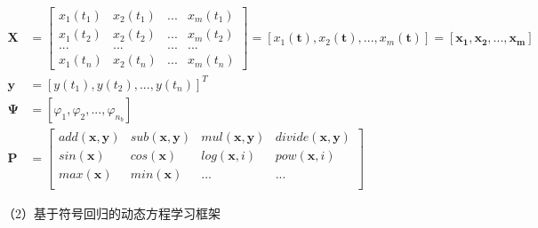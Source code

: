 \begin{subequations}
\begin{align}
\mathbf{X} &= \begin{bmatrix}
x_{1}(t_{1}) & x_{2}(t_{1}) & ... & x_{m}(t_{1}) \\ 
x_{1}(t_{2}) & x_{2}(t_{2})  & ...  & x_{m}(t_{2}) \\ 
... & ... & ...  & ... \\ 
x_{1}(t_{n}) & x_{2}(t_{n})  & ...  & x_{m}(t_{n}) 
\end{bmatrix} = [x_{1}(\mathbf{t}), x_{2}(\mathbf{t}), ..., x_{m}(\mathbf{t})] = [\mathbf{x_{1}}, \mathbf{x_{2}}, ..., \mathbf{x_{m}}] \label{equ:sr-object-func-x} \\
\mathbf{y} &= [y(t_{1}), y(t_{2}), ..., y(t_{n})]^{T} \label{equ:sr-object-func-y}\\
\mathbf{\Psi} &= [\varphi_{1}, \varphi_{2}, ..., \varphi_{n_{b}}] \label{equ:sr-basefunc} \\
\mathbf{P} &= \begin{bmatrix}
add(\mathbf{x,y}) & sub(\mathbf{x,y}) & mul(\mathbf{x,y}) & divide(\mathbf{x,y}) \\ 
sin(\mathbf{x}) & cos(\mathbf{x}) & log(\mathbf{x}, i) & pow(\mathbf{x}, i) \\ 
max(\mathbf{x})& min(\mathbf{x}) & ... & ...  \\ 
\end{bmatrix} \label{equ:sr-ops} 
\end{align}
\end{subequations}

（2）基于符号回归的动态方程学习框架


